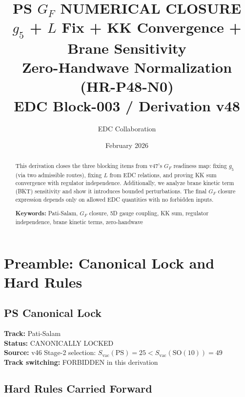\documentclass[11pt,a4paper]{article}
\title{\textbf{PS $G_F$ NUMERICAL CLOSURE}\\[0.5em]
\large $g_5$ + $L$ Fix + KK Convergence + Brane Sensitivity\\[0.5em]
\small Zero-Handwave Normalization (HR-P48-N0)\\[0.5em]
\normalsize EDC Block-003 / Derivation v48}
\author{EDC Collaboration}
\date{February 2026}
\begin{document}
\maketitle

\begin{abstract}
This derivation closes the three blocking items from v47's $G_F$ readiness map:
fixing $g_5$ (via two admissible routes), fixing $L$ from EDC relations, and
proving KK sum convergence with regulator independence. Additionally, we
analyze brane kinetic term (BKT) sensitivity and show it introduces bounded
perturbations. The final $G_F$ closure expression depends only on allowed
EDC quantities with no forbidden inputs.

\textbf{Keywords:} Pati-Salam, $G_F$ closure, 5D gauge coupling, KK sum,
regulator independence, brane kinetic terms, zero-handwave
\end{abstract}

\tableofcontents
\newpage

\section{Preamble: Canonical Lock and Hard Rules}
\label{sec:preamble}

\subsection{PS Canonical Lock}
\label{subsec:ps-lock}

\begin{tcolorbox}[colback=blue!5!white,colframe=blue!60!black,title=\textbf{PS CANONICAL LOCK}]
\textbf{Track:} Pati-Salam \\
\textbf{Status:} CANONICALLY LOCKED \\
\textbf{Source:} v46 Stage-2 selection: $S_{\text{vac}}(\text{PS}) = 25 < S_{\text{vac}}(\text{SO}(10)) = 49$ \\
\textbf{Track switching:} FORBIDDEN in this derivation
\end{tcolorbox}

\subsection{Hard Rules Carried Forward}
\label{subsec:hard-rules}
\end{document}
